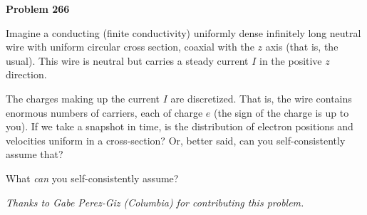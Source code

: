 \documentclass[12pt]{article}
\begin{document}
\begin{pottproblem}
\textbf{Problem 266}

Imagine a conducting (finite conductivity) uniformly dense infinitely
long neutral wire with uniform circular cross section, coaxial with the
$z$ axis (that is, the usual).
This wire is neutral but carries a steady current $I$
in the positive $z$ direction.

The charges making up the current $I$ are
discretized.
That is, the wire contains enormous numbers of carriers, each of charge $e$
(the sign of the charge is up to you).
If we take a snapshot in time, is the distribution of
electron positions and velocities uniform in a cross-section?  Or,
better said, can you self-consistently assume that?

What \emph{can} you self-consistently assume?

{\normalsize\emph{Thanks to Gabe Perez-Giz (Columbia) for contributing this problem.}}
\end{pottproblem}
\end{document}
